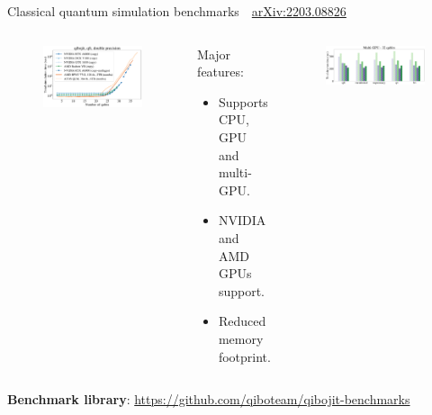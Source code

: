 \documentclass[aspectratio=169, 10pt, xcolor={svgnames}, hyperref={linkcolor=black}]{beamer}
\begin{document}
 \begin{frame}{Classical quantum simulation benchmarks \hfill \faBook\,\, \href{https://arxiv.org/abs/2203.08826}{arXiv:2203.08826}}

   \begin{columns}
     \column{7cm}

   \begin{figure}
     \includegraphics[width=\textwidth]{figures/devices_qft_total_simulation_time_double.pdf}
   \end{figure}

     \column{7cm}
     \begin{exampleblock}{Major features:}
       \begin{itemize}
         \item Supports CPU, GPU and multi-GPU.
         \item NVIDIA and AMD GPUs support.
         \item Reduced memory footprint.
       \end{itemize}
     \end{exampleblock}
     \begin{figure}
       \includegraphics[width=\textwidth]{figures/multigpu_32qubits_total_dry_time_double.pdf}
     \end{figure}
   \end{columns}

   {\small {\bf Benchmark library}: \url{https://github.com/qiboteam/qibojit-benchmarks} }

 \end{frame}
\end{document}
